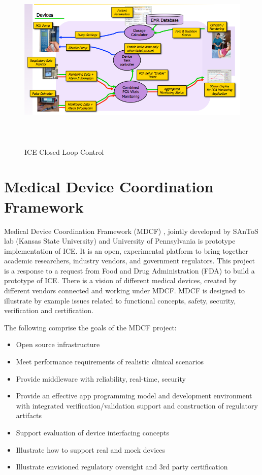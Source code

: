 \begin{figure}[ht]%
    \begin{center}
    	\includegraphics[height=3.5in]{figures/ice.png}   	
    \end{center}
    \caption{ICE Closed Loop Control}
    \label{figure:ice}
\end{figure}


\section{Medical Device Coordination Framework}
\label{background:mdcf}

Medical Device Coordination Framework (MDCF) \cite{MDCF:Paper}, jointly developed by SAnToS lab (Kansas State University) and University of Pennsylvania is prototype implementation of ICE. It is an open, experimental platform to bring together academic researchers, industry vendors, and government regulators. This project is a response to a request from Food and Drug Administration (FDA) to build a prototype of ICE. There is a vision of different medical devices, created by different vendors connected and working under MDCF. MDCF is designed to illustrate by example issues related to functional concepts, safety, security, verification and certification. 

The following comprise the goals of the MDCF project:
\begin{itemize}
	\item Open source infrastructure
	\item Meet performance requirements of realistic clinical scenarios
	\item Provide middleware with reliability, real-time, security
	\item Provide an effective app programming model and development environment with integrated verification/validation support and construction of regulatory artifacts
	\item Support evaluation of device interfacing concepts
	\item Illustrate how to support real and mock devices
	\item Illustrate envisioned regulatory oversight and 3rd party certification
\end{itemize}

